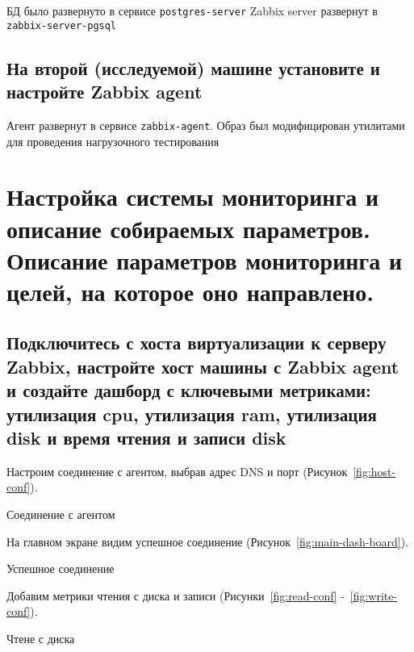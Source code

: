 БД было развернуто в сервисе \texttt{postgres-server} Zabbix server развернут в \texttt{zabbix-server-pgsql}

\subsection{На второй (исследуемой) машине установите и настройте Zabbix agent}

Агент развернут в сервисе \texttt{zabbix-agent}.
Образ был модифицирован утилитами для проведения нагрузочного тестирования


\clearpage

\section{Настройка системы мониторинга и описание собираемых параметров.
Описание параметров мониторинга и целей, на которое оно направлено.}

\subsection{Подключитесь с хоста виртуализации к серверу Zabbix, настройте хост
машины с Zabbix agent и создайте дашборд с ключевыми метриками:
утилизация cpu, утилизация ram, утилизация disk и время чтения и записи disk}

Настроим соединение с агентом, выбрав адрес DNS и порт (Рисунок~\ref{fig:host-conf}).


\begin{image}
    \caption{Соединение с агентом}
    \label{fig:host-conf}
\end{image}

На главном экране видим успешное соединение (Рисунок~\ref{fig:main-dash-board}).

\begin{image}
    \caption{Успешное соединение}
    \label{fig:main-dash-board}
\end{image}

\clearpage

Добавим метрики чтения с диска и записи (Рисунки~\ref{fig:read-conf} -~\ref{fig:write-conf}).

\begin{image}
    \caption{Чтене с диска}
    \label{fig:read-conf}
\end{image}

